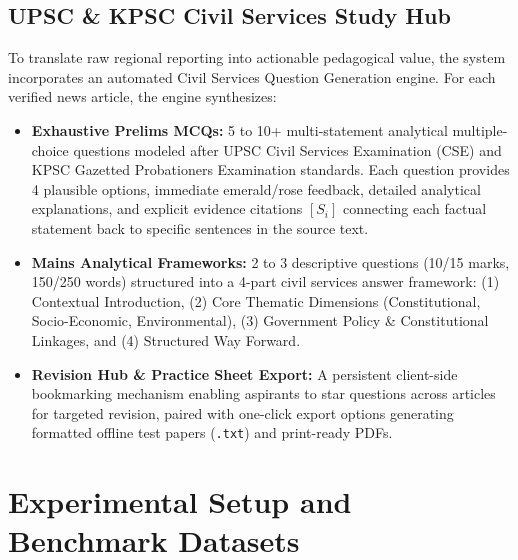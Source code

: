 \documentclass[conference]{IEEEtran}
\begin{document}
\subsection{UPSC \& KPSC Civil Services Study Hub}
To translate raw regional reporting into actionable pedagogical value, the system incorporates an automated Civil Services Question Generation engine. For each verified news article, the engine synthesizes:
\begin{itemize}
    \item \textbf{Exhaustive Prelims MCQs:} 5 to 10+ multi-statement analytical multiple-choice questions modeled after UPSC Civil Services Examination (CSE) and KPSC Gazetted Probationers Examination standards. Each question provides 4 plausible options, immediate emerald/rose feedback, detailed analytical explanations, and explicit evidence citations $[S_i]$ connecting each factual statement back to specific sentences in the source text.
    \item \textbf{Mains Analytical Frameworks:} 2 to 3 descriptive questions (10/15 marks, 150/250 words) structured into a 4-part civil services answer framework: (1) Contextual Introduction, (2) Core Thematic Dimensions (Constitutional, Socio-Economic, Environmental), (3) Government Policy \& Constitutional Linkages, and (4) Structured Way Forward.
    \item \textbf{Revision Hub \& Practice Sheet Export:} A persistent client-side bookmarking mechanism enabling aspirants to star questions across articles for targeted revision, paired with one-click export options generating formatted offline test papers (\texttt{.txt}) and print-ready PDFs.
\end{itemize}

\section{Experimental Setup and Benchmark Datasets}
\label{sec:experimental_setup}
\end{document}
